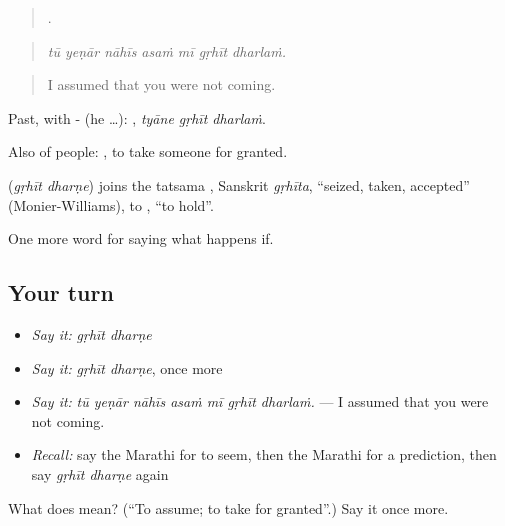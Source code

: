 \begin{quote}
      .
\end{quote}

\begin{quote}
\emph{tū yeṇār nāhīs asaṁ mī gṛhīt dharlaṁ.}
\end{quote}

\begin{quote}
I assumed that you were not coming.
\end{quote}

Past, with - (he …):   , \emph{tyāne gṛhīt dharlaṁ}.

Also of people:   , to take someone for granted.

\begin{cousinweb}
\textbf{ } (\emph{gṛhīt dharṇe}) joins the tatsama , Sanskrit \emph{gṛhīta}, \textquotedblleft{}seized, taken, accepted\textquotedblright{} (Monier-Williams), to , \textquotedblleft{}to hold\textquotedblright{}.
\end{cousinweb}

\begin{grammarlens}[title={What you've built}]
One more word for saying what happens if.
\end{grammarlens}

\subsection*{Your turn}
\begin{itemize}
\raggedright
  \item \emph{Say it:} \emph{gṛhīt dharṇe}
  \item \emph{Say it:} \emph{gṛhīt dharṇe}, once more
  \item \emph{Say it:} \emph{tū yeṇār nāhīs asaṁ mī gṛhīt dharlaṁ.} — I assumed that you were not coming.
  \item \emph{Recall:} say the Marathi for to seem, then the Marathi for a prediction, then say \emph{gṛhīt dharṇe} again
\end{itemize}

\begin{tcolorbox}[breakable,colback=teal!4,colframe=teal!35!black,title={Before you move on}]
What does   mean? (\textquotedblleft{}To assume; to take for granted\textquotedblright{}.) Say it once more.
\end{tcolorbox}
